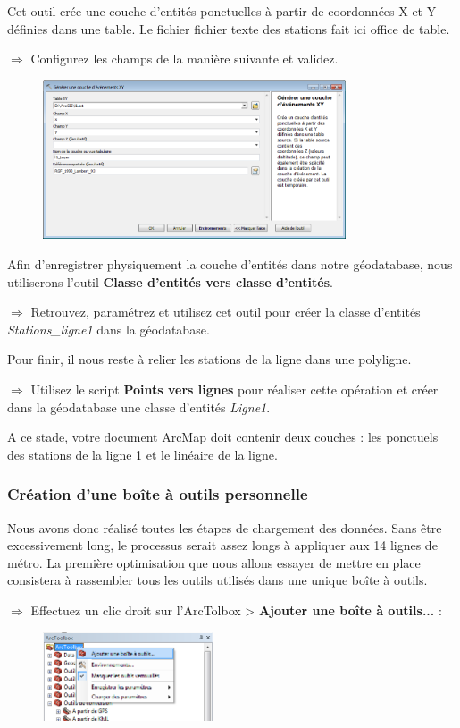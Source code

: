 \documentclass[11pt]{article}
\newcommand{\action}{$\Rightarrow$ }
\begin{document}
Cet outil crée une couche d'entités ponctuelles à partir de coordonnées X et Y définies dans une table. Le fichier fichier texte des stations fait ici office de table.

\action Configurez les champs de la manière suivante et validez.
\begin{figure}[H]
	\center \includegraphics[width=0.8\textwidth]{img/td3/toolbox_generer_xy.png}\\
\end{figure}

Afin d'enregistrer physiquement la couche d'entités dans notre géodatabase, nous utiliserons l'outil \textbf{Classe d'entités vers classe d'entités}.

\action Retrouvez, paramétrez et utilisez cet outil pour créer la classe d'entités \textit{Stations\_ligne1} dans la géodatabase.

Pour finir, il nous reste à relier les stations de la ligne dans une polyligne. 

\action Utilisez le script \textbf{Points vers lignes} pour réaliser cette opération et créer dans la géodatabase une classe d'entités \textit{Ligne1}.

A ce stade, votre document ArcMap doit contenir deux couches : les ponctuels des stations de la ligne 1 et le linéaire de la ligne.


\subsubsection{Création d'une boîte à outils personnelle}
Nous avons donc réalisé toutes les étapes de chargement des données. Sans être excessivement long, le processus serait assez longs à appliquer aux 14 lignes de métro. La première optimisation que nous allons essayer de mettre en place consistera à rassembler tous les outils utilisés dans une unique boîte à outils.

\action Effectuez un clic droit sur l'ArcTolbox > \textbf{Ajouter une boîte à outils...} :
\begin{figure}[H]
	\center \includegraphics[width=0.45\textwidth]{img/td3/arctoolbox_ajouter.png}\\
\end{figure}
\end{document}
